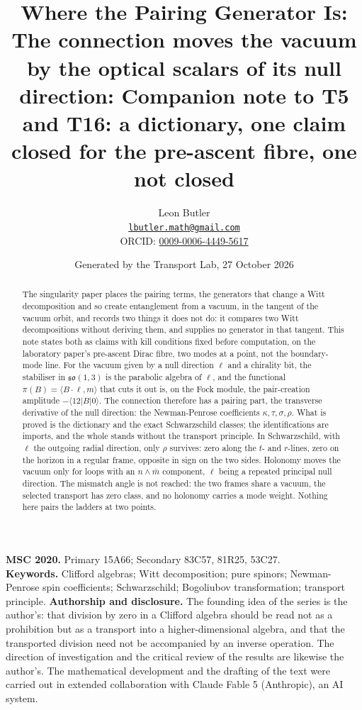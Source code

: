 \documentclass[11pt]{article}
\title{\bfseries Where the Pairing Generator Is: The connection moves the vacuum by the optical scalars of its null direction: Companion note to T5 and T16: a dictionary, one claim closed for the pre-ascent fibre, one not closed}
\author{Leon Butler\\ \normalsize\href{mailto:lbutler.math@gmail.com}{\texttt{lbutler.math@gmail.com}}\\ \normalsize ORCID: \href{https://orcid.org/0009-0006-4449-5617}{0009-0006-4449-5617}}
\date{Generated by the Transport Lab, 27 October 2026}
\theoremstyle{definition}
\theoremstyle{plain}
\providecommand{\mb}{}\renewcommand{\mb}{\bar m}
\providecommand{\pv}{}\renewcommand{\pv}{\pi}
\providecommand{\so}{}\renewcommand{\so}{\mathfrak{so}}
\providecommand{\bra}{}\renewcommand{\bra}[1]{\langle #1|}
\providecommand{\ip}{}\renewcommand{\ip}[2]{\langle #1, #2\rangle}
\providecommand{\ket}{}\renewcommand{\ket}[1]{|#1\rangle}
\begin{document}
\maketitle
\begin{abstract}
\normalsize
The singularity paper places the pairing terms, the generators that change a Witt decomposition and so create entanglement from a vacuum, in the tangent of the vacuum orbit, and records two things it does not do: it compares two Witt decompositions without deriving them, and supplies no generator in that tangent. This note states both as claims with kill conditions fixed before computation, on the laboratory paper's pre-ascent Dirac fibre, two modes at a point, not the boundary-mode line. For the vacuum given by a null direction $\ell$ and a chirality bit, the stabiliser in $\so(1,3)$ is the parabolic algebra of $\ell$, and the functional $\pv(B) = \ip{B\cdot\ell}{m}$ that cuts it out is, on the Fock module, the pair-creation amplitude $-\bra{12}B\ket{0}$. The connection therefore has a pairing part, the transverse derivative of the null direction: the Newman-Penrose coefficients $\kappa, \tau, \sigma, \rho$. What is proved is the dictionary and the exact Schwarzschild classes; the identifications are imports, and the whole stands without the transport principle. In Schwarzschild, with $\ell$ the outgoing radial direction, only $\rho$ survives: zero along the $t$- and $r$-lines, zero on the horizon in a regular frame, opposite in sign on the two sides. Holonomy moves the vacuum only for loops with an $n \wedge \mb$ component, $\ell$ being a repeated principal null direction. The mismatch angle is not reached: the two frames share a vacuum, the selected transport has zero class, and no holonomy carries a mode weight. Nothing here pairs the ladders at two points.
\end{abstract}
\medskip
\noindent\textbf{MSC 2020.} Primary 15A66; Secondary 83C57, 81R25, 53C27.\\
\textbf{Keywords.} Clifford algebras; Witt decomposition; pure spinors; Newman-Penrose spin coefficients; Schwarzschild; Bogoliubov transformation; transport principle.
\newpage
\noindent \textbf{Authorship and disclosure. }The founding idea of the series is the author's: that division by zero in a Clifford algebra should be read not as a prohibition but as a transport into a higher-dimensional algebra, and that the transported division need not be accompanied by an inverse operation. The direction of investigation and the critical review of the results are likewise the author's. The mathematical development and the drafting of the text were carried out in extended collaboration with Claude Fable 5 (Anthropic), an AI system.
\end{document}
